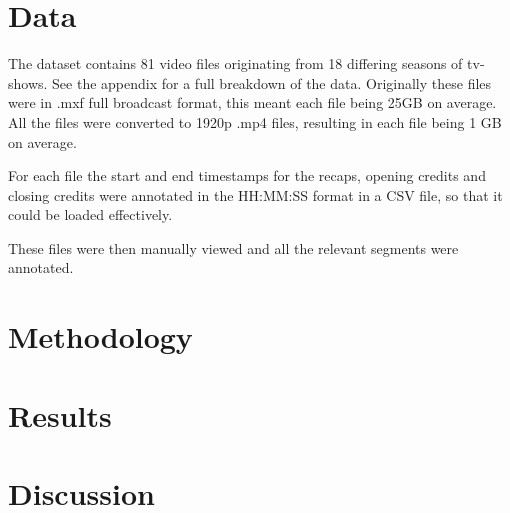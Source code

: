 \documentclass{article}
\begin{document}

\section{Data} \label{data}

The dataset contains 81 video files originating from 18 differing seasons of tv-shows. See the appendix for a full breakdown of the data. Originally these files were in .mxf full broadcast format, this meant each file being 25GB on average. All the files were converted to 1920p .mp4 files, resulting in each file being 1 GB on average.

For each file the start and end timestamps for the recaps, opening credits and closing credits were annotated in the HH:MM:SS format in a CSV file, so that it could be loaded effectively.

These files were then manually viewed and all the relevant segments were annotated. 

\section{Methodology} \label{methodology}

\section{Results} \label{results}

\section{Discussion} \label{discussion}



\end{document}
